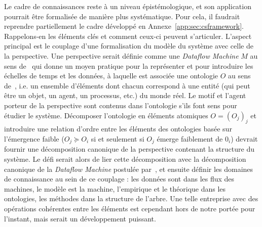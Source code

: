 {Le cadre de connaissances reste à un niveau épistémologique, et son application pourrait être formalisée de manière plus systématique. Pour cela, il faudrait reprendre partiellement le cadre développé en Annexe~\ref{app:sec:csframework}. Rappelons-en les éléments clés et comment ceux-ci peuvent s'articuler. L'aspect principal est le couplage d'une formalisation du modèle du système avec celle de la perspective. Une perspective serait définie comme une \emph{Dataflow Machine} $M$ au sens de~\cite{golden2012modeling} qui donne un moyen pratique pour la représenter et pour introduire les échelles de temps et les données, à laquelle est associée une ontologie $O$ au sens de~\cite{livet2010}, i.e. un ensemble d'éléments dont chacun correspond à une entité (qui peut être un objet, un agent, un processus, etc.) du monde réel. Le motif et l'agent porteur de la perspective sont contenus dans l'ontologie s'ils font sens pour étudier le système. Décomposer l'ontologie en éléments atomiques $O=(O_j)_j$ et introduire une relation d'ordre entre les éléments des ontologies basée sur l'émergence faible ($O_j\succcurlyeq O_i$ si et seulement si $O_j$ émerge faiblement de $0_i$) devrait fournir une décomposition canonique de la perspective contenant la structure du système. Le défi serait alors de lier cette décomposition avec la décomposition canonique de la \emph{Dataflow Machine} postulée par~\cite{golden2012modeling}, et ensuite définir les domaines de connaissance au sein de ce couplage : les données sont dans les flux des machines, le modèle est la machine, l'empirique et le théorique dans les ontologies, les méthodes dans la structure de l'arbre. Une telle entreprise avec des opérations cohérentes entre les éléments est cependant hors de notre portée pour l'instant, mais serait un développement puissant.
}


